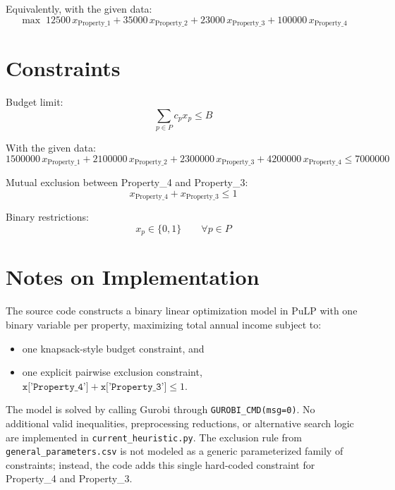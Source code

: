Equivalently, with the given data:
\[
\max \; 12500\,x_{\text{Property\_1}}
+ 35000\,x_{\text{Property\_2}}
+ 23000\,x_{\text{Property\_3}}
+ 100000\,x_{\text{Property\_4}}
\]

\section*{Constraints}

Budget limit:
\[
\sum_{p \in P} c_p x_p \le B
\]

With the given data:
\[
1500000\,x_{\text{Property\_1}}
+ 2100000\,x_{\text{Property\_2}}
+ 2300000\,x_{\text{Property\_3}}
+ 4200000\,x_{\text{Property\_4}}
\le 7000000
\]

Mutual exclusion between Property\_4 and Property\_3:
\[
x_{\text{Property\_4}} + x_{\text{Property\_3}} \le 1
\]

Binary restrictions:
\[
x_p \in \{0,1\}
\qquad \forall p \in P
\]

\section*{Notes on Implementation}

The source code constructs a binary linear optimization model in PuLP with one binary variable per property, maximizing total annual income subject to:
\begin{itemize}
    \item one knapsack-style budget constraint, and
    \item one explicit pairwise exclusion constraint, \(\texttt{x['Property\_4']} + \texttt{x['Property\_3']} \le 1\).
\end{itemize}

The model is solved by calling Gurobi through \texttt{GUROBI\_CMD(msg=0)}. No additional valid inequalities, preprocessing reductions, or alternative search logic are implemented in \texttt{current\_heuristic.py}. The exclusion rule from \texttt{general\_parameters.csv} is not modeled as a generic parameterized family of constraints; instead, the code adds this single hard-coded constraint for Property\_4 and Property\_3.
